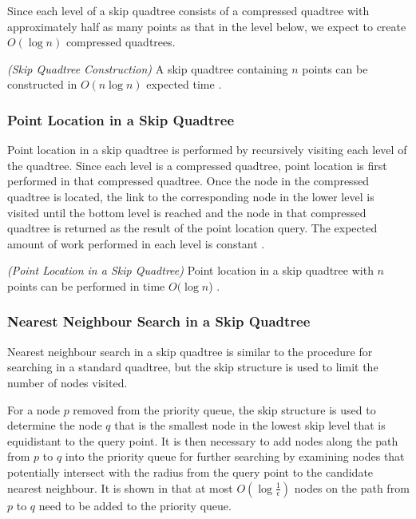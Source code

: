 \documentclass[mcs]{scsthesis}
\begin{document}
Since each level of a skip quadtree consists of a compressed quadtree with
approximately half as many points as that in the level below, we expect to
create \(O(\log n)\) compressed quadtrees.

\begin{thm} \emph{(Skip Quadtree Construction)}
A skip quadtree containing $n$ points can be constructed in \(O(n \log n)\)
expected time \cite{skipquadtree}.
\end{thm}

\subsubsection{Point Location in a Skip Quadtree}

Point location in a skip quadtree is performed by recursively visiting each level
of the quadtree. Since each level is a compressed quadtree, point location is
first performed in that compressed quadtree. Once the node in the compressed
quadtree is located, the link to the corresponding node in the lower level
is visited until the bottom level is reached and the node in that compressed
quadtree is returned as the result of the point location query. The expected
amount of work performed in each level is constant \cite{skipquadtree}.

\begin{thm} \emph{(Point Location in a Skip Quadtree)} 
Point location in a skip quadtree with $n$ points can be performed in time
\(O(\log n\)) \cite{skipquadtree}. 
\end{thm}

\subsubsection{Nearest Neighbour Search in a Skip Quadtree}

Nearest neighbour search in a skip quadtree is similar to the procedure for
searching in a standard quadtree, but the skip structure is used to limit
the number of nodes visited.

For a node \(p\) removed from the priority queue, the skip structure is used to
determine the node \(q\) that is the smallest node in the lowest skip level
that is equidistant to the query point. It is then necessary to add nodes along
the path from \(p\) to \(q\) into the priority queue for further searching by
examining nodes that potentially intersect with the radius from the query point
to the candidate nearest neighbour. It is shown in \cite{skipquadtree}
that at most \(O(\log \frac{1}{\epsilon})\) nodes on the path from \(p\) to \(q\)
need to be added to the priority queue.
\end{document}
